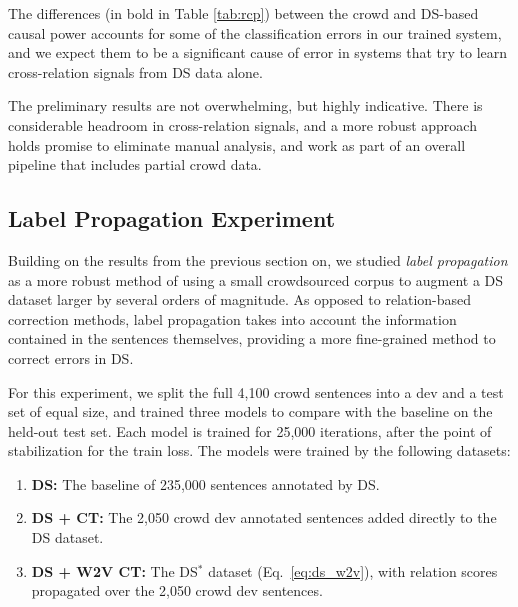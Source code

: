 \begin{table}[htb!]
\centering
{}
\caption{Precision \& Recall at 20,000 training steps.}
\label{tab:cnn_res}
\end{table}

The differences (in bold in Table \ref{tab:rcp}) between the crowd and DS-based causal power accounts for some of the classification errors in our trained system, and we expect them to be a significant cause of error in systems that try to learn cross-relation signals from DS data alone.

The preliminary results are not overwhelming, but highly indicative. There is considerable headroom in cross-relation signals, and a more robust approach holds promise to eliminate manual analysis, and work as part of an overall pipeline that includes partial crowd data.


\subsection{Label Propagation Experiment}

Building on the results from the previous section on, we studied \textit{label propagation} as a more robust method of using a small crowdsourced corpus to augment a DS dataset larger by several orders of magnitude. As opposed to relation-based correction methods, label propagation takes into account the information contained in the sentences themselves, providing a more fine-grained method to correct errors in DS.

For this experiment, we split the full 4,100 crowd sentences into a dev and a test set of equal size, and trained three models to compare with the baseline on the held-out test set. Each model is trained for 25,000 iterations, after the point of stabilization for the train loss. The models were trained by the following datasets:

\begin{enumerate}
\item \textbf{DS:} The baseline of 235,000 sentences annotated by DS.
\item \textbf{DS + CT:} The 2,050 crowd dev annotated sentences added directly to the DS dataset.
\item \textbf{DS + W2V CT:} The DS$^{*}$ dataset (Eq.~\ref{eq:ds_w2v}), with relation scores propagated over the 2,050 crowd dev sentences.
\end{enumerate}

